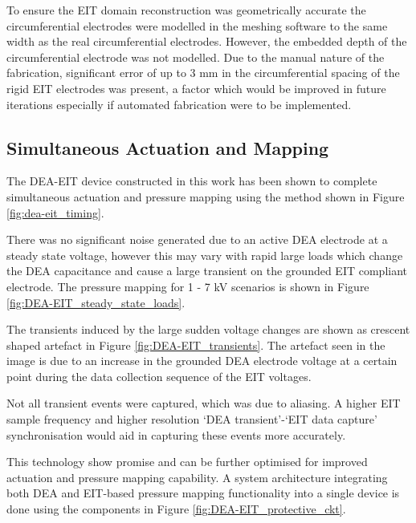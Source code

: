 To ensure the EIT domain reconstruction was geometrically accurate the circumferential electrodes were modelled in the meshing software to the same width as the real circumferential electrodes. However, the embedded depth of the circumferential electrode was not modelled. Due to the manual nature of the fabrication, significant error of up to 3 mm in the circumferential spacing of the rigid EIT electrodes was present, a factor which would be improved in future iterations especially if automated fabrication were to be implemented.


\subsection{Simultaneous Actuation and Mapping}
The DEA-EIT device constructed in this work has been shown to complete simultaneous actuation and pressure mapping using the method shown in Figure \ref{fig:dea-eit_timing}.

There was no significant noise generated due to an active DEA electrode at a steady state voltage, however this may vary with rapid large loads which change the DEA capacitance and cause a large transient on the grounded EIT compliant electrode. The pressure mapping for 1 - 7 kV scenarios is shown in Figure \ref{fig:DEA-EIT_steady_state_loads}. 

The transients induced by the large sudden voltage changes are shown as crescent shaped artefact in Figure \ref{fig:DEA-EIT_transients}. The artefact seen in the image is due to an increase in the grounded DEA electrode voltage at a certain point during the data collection sequence of the EIT voltages. 

Not all transient events were captured, which was due to aliasing. A higher EIT sample frequency and higher resolution `DEA transient'-`EIT data capture' synchronisation would aid in capturing these events more accurately.

This technology show promise and can be further optimised for improved actuation and pressure mapping capability. A system architecture integrating both DEA and EIT-based pressure mapping functionality into a single device is done using the components in Figure \ref{fig:DEA-EIT_protective_ckt}. 

